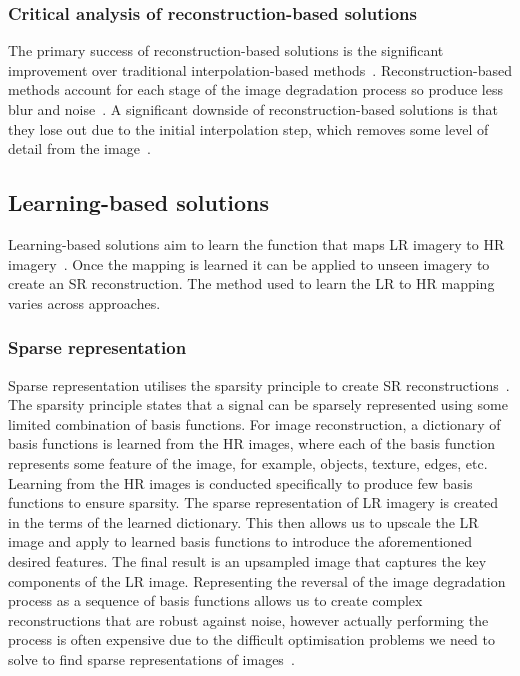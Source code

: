 \subsubsection{Critical analysis of reconstruction-based solutions}
The primary success of reconstruction-based solutions is the significant improvement over traditional interpolation-based methods~\cite{interpolation}. Reconstruction-based methods account for each stage of the image degradation process so produce less blur and noise~\cite{interpolation}. A significant downside of reconstruction-based solutions is that they lose out due to the initial interpolation step, which removes some level of detail from the image~\cite{remoteSensingGANsReview}.

\subsection{Learning-based solutions}
Learning-based solutions aim to learn the function that maps LR imagery to HR imagery~\cite{superResRemoteSensingOverview}. Once the mapping is learned it can be applied to unseen imagery to create an SR reconstruction. The method used to learn the LR to HR mapping varies across approaches.

\subsubsection{Sparse representation}
Sparse representation utilises the sparsity principle to create SR reconstructions~\cite{superResRemoteSensingOverview}. The sparsity principle states that a signal can be sparsely represented using some limited combination of basis functions. For image reconstruction, a dictionary of basis functions is learned from the HR images, where each of the basis function represents some feature of the image, for example, objects, texture, edges, etc. Learning from the HR images is conducted specifically to produce few basis functions to ensure sparsity. The sparse representation of LR imagery is created in the terms of the learned dictionary. This then allows us to upscale the LR image and apply to learned basis functions to introduce the aforementioned desired features. The final result is an upsampled image that captures the key components of the LR image. Representing the reversal of the image degradation process as a sequence of basis functions allows us to create complex reconstructions that are robust against noise, however actually performing the process is often expensive due to the difficult optimisation problems we need to solve to find sparse representations of images~\cite{sparseRep}.

